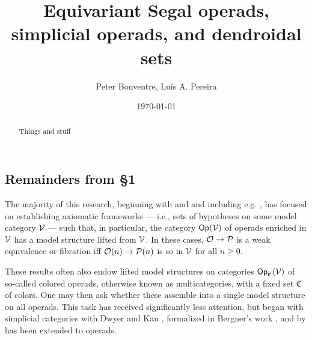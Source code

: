 \documentclass[a4paper,10pt
]{article}%
\title{Equivariant Segal operads, simplicial operads, and dendroidal sets}
\author{Peter Bonventre, Lu\'is A. Pereira}%
\date{\today}
\renewcommand{\1}{\eta}%
\newcommand{\vect}[1]{\text{\overrightharp{\ensuremath{#1}}}}
\begin{document}
\maketitle

\begin{abstract}
      Things and stuff
\end{abstract}

\tableofcontents








\subsection{Remainders from \S 1}




The majority of this research,
beginning with \cite{SS00} and \cite{BM03} and including e.g. \cite{BM07,Mur11,Whi14,Wh16,BB17,PS18,WY18},
has focused on establishing axiomatic frameworks --- i.e., sets of hypotheses on some model category $\mathcal V$ ---
such that, in particular, the category $\mathsf{Op}(\mathcal V)$ of operads enriched in $\mathcal V$
has a model structure lifted from $\mathcal V$.
In these cases, $\mathcal{O} \to \mathcal{P}$ is a weak equivalence or fibration iff $\mathcal{O}(n) \to \mathcal{P}(n)$ is so in $\mathcal V$ for all $n \geq 0$.



These results often also endow lifted model structures on categories $\mathsf{Op}_{\mathfrak C}(\mathcal V)$ of so-called colored operads, otherwise known as multicategories, with a fixed set $\mathfrak C$ of colors.
One may then ask whether these assemble into a single model structure on all operads.
This task has received significantly less attention,
but began with simplicial categories with Dwyer and Kan \cite{DK80}, formalized in Bergner's work \cite{Ber07b}, and by \cite{CM13b,Cav} has been extended to operads.
\end{document}
